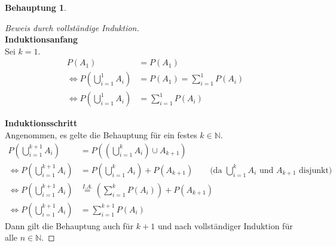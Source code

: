 \documentclass[a4paper]{scrartcl}
\newtheorem*{behaupt}{Behauptung}
\newcommand{\gdw}{\Leftrightarrow}
\begin{document}
\begin{enumerate}[label=\bfseries\arabic*.]
\begin{enumerate}[label=(\roman*)]
\begin{behaupt}
                \end{behaupt}
                \begin{proof}[Beweis durch vollständige Induktion] \hfill \\
                    \textbf{Induktionsanfang} \\
                    Sei $k = 1$.
                    \begin{equation}
                        \begin{split}
                            P(A_1) &= P(A_1) \\
                            \gdw P \left( \bigcup_{i=1}^1 A_i \right)
                            &= P(A_1) = \sum_{i=1}^1 P(A_i) \\
                            \gdw P \left( \bigcup_{i=1}^1 A_i \right)
                            &= \sum_{i=1}^1 P(A_i)
                        \end{split}
                    \end{equation}
                    
                    \textbf{Induktionsschritt} \\
                    Angenommen, es gelte die Behauptung für ein festes
                    $k \in  \mathbb{N}$.
                    \begin{equation}
                        \begin{split}
                            P \left( \bigcup_{i=1}^{k+1} A_i \right)
                            &= P \left( \left( \bigcup_{i=1}^k A_i \right)
                            \cup A_{k+1} \right) \\
                            \gdw P \left( \bigcup_{i=1}^{k+1} A_i \right)
                            &= P \left( \bigcup_{i=1}^k A_i \right) + P (A_{k+1})
                            \qquad \text{(da }\bigcup_{i=1}^{k} A_i \text{ und } A_{k+1} \text{ disjunkt)} \\
                            \gdw P \left( \bigcup_{i=1}^{k+1} A_i \right)
                            &\stackrel{I.A.}{=} \left( \sum_{i=1}^k P(A_i) \right)
                            + P (A_{k+1}) \\
                            \gdw P \left( \bigcup_{i=1}^{k+1} A_i \right)
                            &= \sum_{i=1}^{k+1} P(A_i)
                        \end{split}
                    \end{equation}
                    Dann gilt die Behauptung auch für $k+1$ und nach
                    vollständiger Induktion für alle $n \in \mathbb{N}$.
                    

\end{proof}
\end{enumerate}
\end{enumerate}
\end{document}
